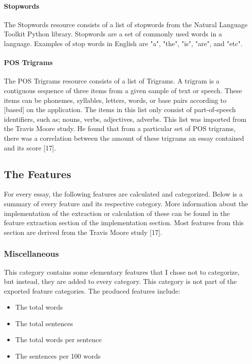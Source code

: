 \paragraph{Stopwords} The Stopwords resource consists of a list of stopwords from the Natural Language Toolkit Python library. Stopwords are a set of commonly used words in a language. Examples of stop words in English are "a", "the", "is", "are", and "etc".

\paragraph{POS Trigrams} The POS Trigrams resource consists of a list of Trigrams. A trigram is a contiguous sequence of three items from a given sample of text or speech. These items can be phonemes, syllables, letters, words, or base pairs according to [based] on the application. The items in this list only consist of part-of-speech identifiers, such as; nouns, verbs, adjectives, adverbs. This list was imported from the Travis Moore study. He found that from a particular set of POS trigrams, there was a correlation between the amount of these trigrams an essay contained and its score [17]. 

\subsection{The Features}
For every essay, the following features are calculated and categorized. Below is a summary of every feature and its respective category. More information about the implementation of the extraction or calculation of these can be found in the feature extraction section of the implementation section. Most features from this section are derived from the Travis Moore study [17].

\subsubsection{Miscellaneous}
This category contains some elementary features that I chose not to categorize, but instead, they are added to every category. This category is not part of the exported feature categories. The produced features include:
\begin{itemize}
 \item The total words
 \item The total sentences
 \item The total words per sentence
 \item The sentences per 100 words
\end{itemize}

